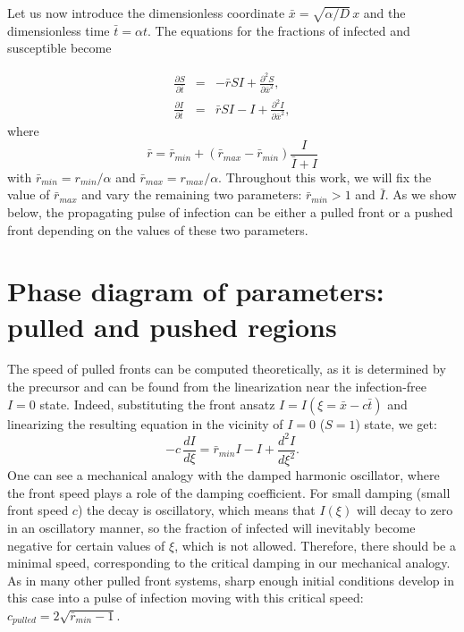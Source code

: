 \documentclass[pre,aps,twocolumn,showpacs]{revtex4}
\begin{document}
Let us now introduce the dimensionless coordinate $\bar{x} = \sqrt{\alpha/D}\, x$ and the dimensionless time $\bar{t} = \alpha t$. The equations for the fractions of infected and susceptible become

\begin{eqnarray}
\frac{\partial S}{\partial \bar{t}} &=& - \bar{r} S I +  \frac{\partial^2 S}{\partial \bar{x}^2}, \\ \nonumber
\frac{\partial I}{\partial \bar{t}} &=& \bar{r} S I - I  +  \frac{\partial^2 I}{\partial \bar{x}^2},
\end{eqnarray}
where
\begin{equation}
\bar{r} = \bar{r}_{min} + (\bar{r}_{max}-\bar{r}_{min})\frac{I}{\bar{I}+I}
\end{equation}
with $\bar{r}_{min} = r_{min}/\alpha$ and $\bar{r}_{max} = r_{max}/\alpha$. Throughout this work, we will fix the value of $\bar{r}_{max}$ and vary the remaining two parameters: $\bar{r}_{min}>1$ and $\bar{I}$. As we show below, the propagating pulse of infection can be either a pulled front or a pushed front depending on the values of these two parameters.

\section{Phase diagram of parameters: pulled and pushed regions}

The speed of pulled fronts can be computed theoretically, as it is determined by the precursor and can be found from the linearization near the infection-free $I=0$ state. Indeed, substituting the front ansatz $ I = I(\xi = \bar{x}-c\bar{t})$ and linearizing the resulting equation in the vicinity of $I=0$ ($S=1$) state, we get:
$$-c\, \frac{d I}{d \xi} = \bar{r}_{min} I -  I  +  \frac{d^2 I}{d \xi^2}.$$ One can see a mechanical analogy with the damped harmonic oscillator, where the front speed plays a role of the damping coefficient. For small damping (small front speed $c$) the decay is oscillatory, which means that $I(\xi)$ will decay to zero in an oscillatory manner, so the fraction of infected will inevitably become negative for certain values of $\xi$, which is not allowed. Therefore, there should be a minimal speed, corresponding to the critical damping in our mechanical analogy. As in many other pulled front systems, sharp enough initial conditions develop in this case into a pulse of infection moving with this critical speed: $c_{pulled} = 2\sqrt{\bar{r}_{min}-1}$.
\end{document}
